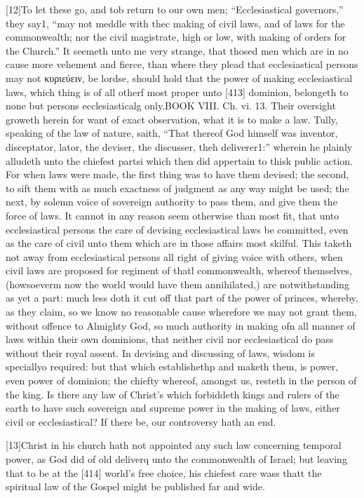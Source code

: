 [12]To let these go, and tob return to our own men; “Ecclesiastical governors,” they say1, “may not meddle with thec making of civil laws, and of laws for the commonwealth; nor the civil magistrate, high or low, with making of orders for the Church.” It seemeth unto me very strange, that thosed men which are in no cause more vehement and fierce, than where they plead that ecclesiastical persons may not κυριεύειν, be lordse, should hold that the power of making ecclesiastical laws, which thing is of all otherf most proper unto [413] dominion, belongeth to none but persons ecclesiasticalg only.BOOK VIII. Ch. vi. 13. Their oversight groweth herein for want of exact observation, what it is to make a law. Tully, speaking of the law of nature, saith, “That thereof God himself was inventor, disceptator, lator, the deviser, the discusser, theh deliverer1:” wherein he plainly alludeth unto the chiefest partsi which then did appertain to thisk public action. For when laws were made, the first thing was to have them devised; the second, to sift them with as much exactness of judgment as any way might be used; the next, by solemn voice of sovereign authority to pass them, and give them the force of laws. It cannot in any reason seem otherwise than most fit, that unto ecclesiastical persons the care of devising ecclesiastical laws be committed, even as the care of civil unto them which are in those affairs most skilful. This taketh not away from ecclesiastical persons all right of giving voice with others, when civil laws are proposed for regiment of thatl commonwealth, whereof themselves, (howsoeverm now the world would have them annihilated,) are notwithstanding as yet a part: much less doth it cut off that part of the power of princes, whereby, as they claim, so we know no reasonable cause wherefore we may not grant them, without offence to Almighty God, so much authority in making ofn all manner of laws within their own dominions, that neither civil nor ecclesiastical do pass without their royal assent. In devising and discussing of laws, wisdom is speciallyo required: but that which establishethp and maketh them, is power, even power of dominion; the chiefty whereof, amongst us, resteth in the person of the king. Is there any law of Christ’s which forbiddeth kings and rulers of the earth to have such sovereign and supreme power in the making of laws, either civil or ecclesiastical? If there be, our controversy hath an end.

[13]Christ in his church hath not appointed any such law concerning temporal power, as God did of old deliverq unto the commonwealth of Israel; but leaving that to be at the [414] world’s free choice, his chiefest care wass thatt the spiritual law of the Gospel might be published far and wide.

